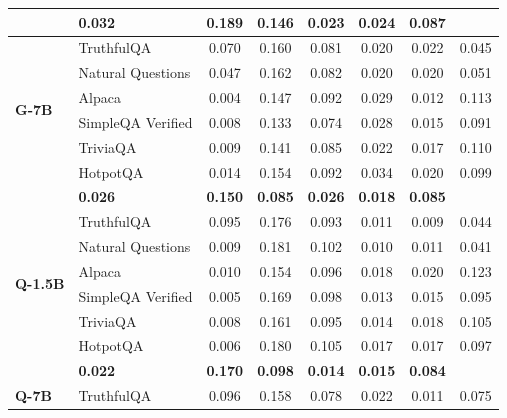 \begin{table}[ht]
\begin{tabular}{ll cccccc}
        \rowcolor[gray]{.95} \multicolumn{2}{r}{\textbf{Total SGS}} & \textbf{0.032} & \textbf{0.189} & \textbf{0.146} & \textbf{0.023} & \textbf{0.024} & \textbf{0.087} \\
        \midrule
        \multirow{6}{*}{\textbf{G-7B}}
        & TruthfulQA \cite{lin2022truthfulqa} & 0.070 & 0.160 & 0.081 & 0.020 & 0.022 & 0.045 \\
        & Natural Questions \cite{kwiatkowski2019natural} & 0.047 & 0.162 & 0.082 & 0.020 & 0.020 & 0.051 \\
        & Alpaca \cite{taori2023stanford-alpaca} & 0.004 & 0.147 & 0.092 & 0.029 & 0.012 & 0.113 \\
        & SimpleQA Verified \cite{haas_simpleqa_2026} & 0.008 & 0.133 & 0.074 & 0.028 & 0.015 & 0.091 \\
        & TriviaQA \cite{joshi2017triviaqa} & 0.009 & 0.141 & 0.085 & 0.022 & 0.017 & 0.110 \\
        & HotpotQA \cite{yang2018hotpotqa} & 0.014 & 0.154 & 0.092 & 0.034 & 0.020 & 0.099 \\
        \rowcolor[gray]{.95} \multicolumn{2}{r}{\textbf{Total SGS}} & \textbf{0.026} & \textbf{0.150} & \textbf{0.085} & \textbf{0.026} & \textbf{0.018} & \textbf{0.085} \\
        \midrule
        \multirow{6}{*}{\textbf{Q-1.5B}}
        & TruthfulQA \cite{lin2022truthfulqa} & 0.095 & 0.176 & 0.093 & 0.011 & 0.009 & 0.044 \\
        & Natural Questions \cite{kwiatkowski2019natural} & 0.009 & 0.181 & 0.102 & 0.010 & 0.011 & 0.041 \\
        & Alpaca \cite{taori2023stanford-alpaca} & 0.010 & 0.154 & 0.096 & 0.018 & 0.020 & 0.123 \\
        & SimpleQA Verified \cite{haas_simpleqa_2026} & 0.005 & 0.169 & 0.098 & 0.013 & 0.015 & 0.095 \\
        & TriviaQA \cite{joshi2017triviaqa} & 0.008 & 0.161 & 0.095 & 0.014 & 0.018 & 0.105 \\
        & HotpotQA \cite{yang2018hotpotqa} & 0.006 & 0.180 & 0.105 & 0.017 & 0.017 & 0.097 \\
        \rowcolor[gray]{.95} \multicolumn{2}{r}{\textbf{Total SGS}} & \textbf{0.022} & \textbf{0.170} & \textbf{0.098} & \textbf{0.014} & \textbf{0.015} & \textbf{0.084} \\
        \midrule
        \multirow{6}{*}{\textbf{Q-7B}}
        & TruthfulQA \cite{lin2022truthfulqa} & 0.096 & 0.158 & 0.078 & 0.022 & 0.011 & 0.075 \\

\end{tabular}
\end{table}
